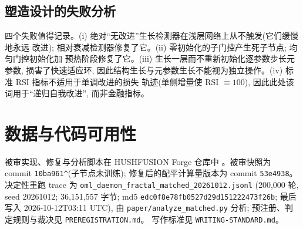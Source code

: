 \documentclass[11pt]{article}
\begin{document}
\subsection{塑造设计的失败分析}

四个失败值得记录。(i) 绝对``无改进''生长检测器在浅层网络上从不触发(它们缓慢地永远
改进); 相对衰减检测器修复了它。(ii) 零初始化的子门控产生死子节点; 均匀门控初始化加
预热阶段修复了它。(iii) 生长一层而不重新初始化逐参数步长元参数, 损害了快速适应环,
因此结构生长与元参数生长不能视为独立操作。(iv) 标准 RSI 指标不适用于单调改进的损失
轨迹(单侧增量使 RSI $\equiv100$), 因此此处该词用于``递归自我改进'', 而非金融指标。

\section*{数据与代码可用性}
被审实现、修复与分析脚本在 HUSHFUSION Forge 仓库中 \cite{HushfusionForge}。被审快照为
commit \texttt{10ba961\textasciicircum}(子节点未训练); 修复后的配平计算量版本为
commit \texttt{53e4938}。决定性重跑 trace 为 \texttt{oml\_daemon\_fractal\_matched\_20261012.jsonl}
(200,000 轮, seed 20261012; 36,151,557 字节; md5
\texttt{edc0f8e78fb0527d29d151222473f26b}; 最后写入 2026-10-12T03:11 UTC), 由
\texttt{paper/analyze\_matched.py} 分析; 预注册、判定规则与裁决见 \texttt{PREREGISTRATION.md}。
写作标准见 \texttt{WRITING-STANDARD.md}。



\end{document}
